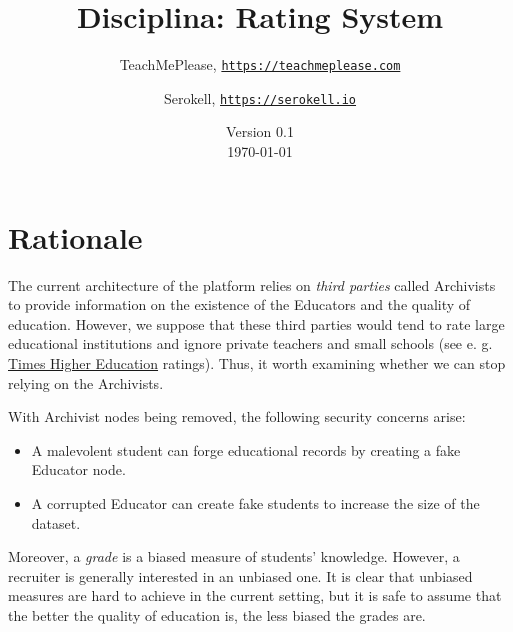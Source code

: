 \documentclass[a4paper]{article}
\title{Disciplina: Rating System}
\author{
TeachMePlease, \href{https://teachmeplease.com}{\texttt{https://teachmeplease.com}} \and
Serokell, \href{https://serokell.io}{\texttt{https://serokell.io}}
}
\date{%
  Version 0.1\\%
  \today
}
\begin{document}
\maketitle

\section*{Rationale}
The current architecture of the platform relies on \textit{third parties} called Archivists to provide information on the existence of the Educators and the quality of education. However, we suppose that these third parties would tend to rate large educational institutions and ignore private teachers and small schools (see e. g. \href{https://www.timeshighereducation.com/world-university-rankings}{Times Higher Education} ratings). Thus, it worth examining whether we can stop relying on the Archivists.

With Archivist nodes being removed, the following security concerns arise:
\begin{itemize}
\item A malevolent student can forge educational records by creating a fake Educator node.
\item A corrupted Educator can create fake students to increase the size of the dataset.
\end{itemize}

Moreover, a \textit{grade} is a biased measure of students' knowledge. However, a recruiter is generally interested in an unbiased one. It is clear that unbiased measures are hard to achieve in the current setting, but it is safe to assume that the better the quality of education is, the less biased the grades are.
\end{document}
